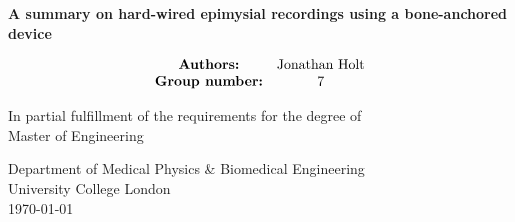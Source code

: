 \begin{titlepage}
    \begin{center}
        \vspace*{1cm}
            
        \huge
        \textbf{A summary on hard-wired epimysial recordings using a bone-anchored device}
            
        \vspace{0.5cm}
        \Large
        \vspace{1.5cm} \begin{align*}
            \begin{matrix}
                \text{\textbf{Authors:}}      & \text{Jonathan Holt} \\
                \text{\textbf{Group number:}} & \text{7} \\
            \end{matrix} \end{align*}

            
        \vfill
            
        In partial fulfillment of the requirements for the degree of \\
        Master of Engineering
            
        \vspace{0.8cm}
            
        \large
        Department of Medical Physics \& Biomedical Engineering\\
        University College London\\
        \today \\
            
    \end{center}
\end{titlepage}